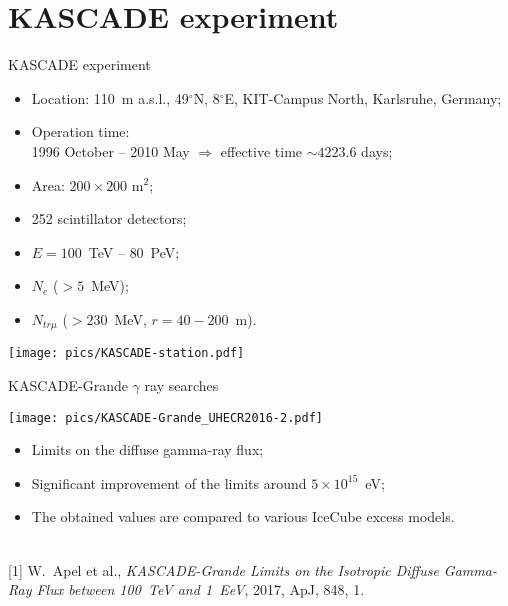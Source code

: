 \section{KASCADE experiment}

\begin{frame}{KASCADE experiment}
\begin{itemize}
\item Location: 110~m a.s.l., 49$^\circ$N, 8$^\circ$E, KIT-Campus North, Karlsruhe, Germany;
\end{itemize}
\vspace{-\itemsep}
\begin{minipage}[c]{0.5\textwidth}
\begin{itemize}
\item Operation time:\\1996 October -- 2010 May $\Rightarrow$ effective time $\sim 4223.6$ days;
\item Area: $200 \times 200$ m$^2$;
\item 252 scintillator detectors;
\item $E = 100$~TeV -- $80$~PeV;
\item $N_e$ ($> 5$~MeV);
\item $N_{tr \mu}$ ($> 230$~MeV, $r = 40 - 200$~m).
\end{itemize}
\end{minipage}\hfill
\begin{minipage}[c]{0.49\textwidth}
\texttt{[image: pics/KASCADE-station.pdf]}
\end{minipage}
\end{frame}

\begin{frame}{KASCADE-Grande $\gamma$ ray searches}
\begin{minipage}[c]{0.59\textwidth}
  \texttt{[image: pics/KASCADE-Grande\_UHECR2016-2.pdf]}
\end{minipage}\hfill
\begin{minipage}[c]{0.4\textwidth}
\begin{itemize}
 \item Limits on the diffuse gamma-ray flux;
 \item Significant improvement of the limits around $5 \times 10^{15}$~eV;
 \item The obtained values are compared to various IceCube excess models.
\end{itemize}
\end{minipage}

\hrulefill\\
\small
[1] W.~Apel et al., \textit{KASCADE-Grande Limits on the Isotropic Diffuse Gamma-Ray Flux between 100~TeV and 1~EeV}, 2017, ApJ, 848, 1.
\end{frame}
